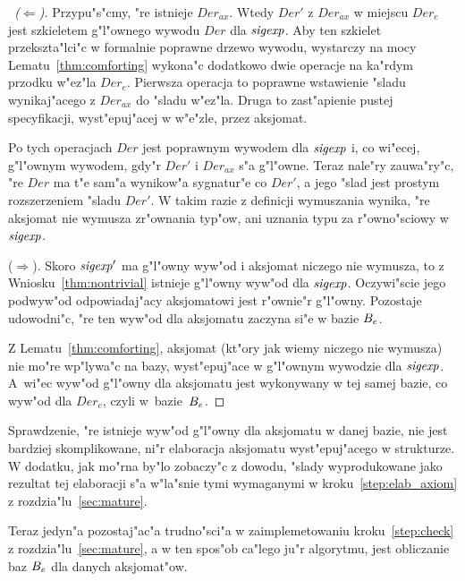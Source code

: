 \begin{proof}[\proofname\ ($\Leftarrow$)]
Przypu"s"cmy, "re istnieje $Der_{ax}$. Wtedy $Der'$ z $Der_{ax}$ w miejscu $Der_e$
jest szkieletem g"l"ownego wywodu $Der$ dla ${\it sigexp}$.
Aby ten szkielet przekszta"lci"c w formalnie poprawne drzewo wywodu, 
wystarczy na mocy Lematu~\ref{thm:comforting}
wykona"c dodatkowo dwie operacje na ka"rdym przodku w"ez"la $Der_e$.
Pierwsza operacja to poprawne wstawienie "sladu wynikaj"acego z $Der_{ax}$ 
do "sladu w"ez"la. Druga to zast"apienie pustej specyfikacji, wyst"epuj"acej
w w"e"zle, przez aksjomat.

Po tych operacjach $Der$ jest poprawnym wywodem dla ${\it sigexp}$ i, co wi"ecej, 
g"l"ownym wywodem, gdy"r $Der'$ i $Der_{ax}$ s"a g"l"owne. Teraz nale"ry zauwa"ry"c, 
"re $Der$ ma t"e sam"a wynikow"a sygnatur"e co $Der'$, a jego "slad
jest prostym rozszerzeniem "sladu $Der'$. W takim razie z definicji wymuszania
wynika, "re aksjomat nie wymusza zr"ownania typ"ow, 
ani uznania typu za r"owno"sciowy w ${\it sigexp}$.

($\Rightarrow$).
Skoro ${\it sigexp}'$ ma g"l"owny wyw"od i aksjomat niczego nie wymusza,
to z Wniosku~\ref{thm:nontrivial} istnieje g"l"owny wyw"od dla ${\it sigexp}$. Oczywi"scie jego
podwyw"od odpowiadaj"acy aksjomatowi jest r"ownie"r g"l"owny.
Pozostaje udowodni"c, "re ten wyw"od dla aksjomatu zaczyna si"e w bazie $B_e$.

Z Lematu~\ref{thm:comforting}, aksjomat (kt"ory jak wiemy niczego nie wymusza)
nie mo"re wp"lywa"c na bazy, wyst"epuj"ace w g"l"ownym wywodzie dla ${\it sigexp}$.
A~wi"ec wyw"od g"l"owny dla aksjomatu jest wykonywany w tej samej bazie, 
co wyw"od dla $Der_e$, czyli w~bazie~$B_e$.
\end{proof}

Sprawdzenie, "re istnieje wyw"od g"l"owny dla aksjomatu w danej bazie,
nie jest bardziej skomplikowane, ni"r elaboracja aksjomatu wyst"epuj"acego w strukturze.
W dodatku, jak mo"rna by"lo zobaczy"c z dowodu, "slady wyprodukowane jako rezultat
tej elaboracji s"a w"la"snie tymi 
wymaganymi w kroku~\ref{step:elab_axiom} z rozdzia"lu~\ref{sec:mature}.

Teraz jedyn"a pozostaj"ac"a trudno"sci"a 
w zaimplemetowaniu kroku~\ref{step:check} z rozdzia"lu~\ref{sec:mature},
a w ten spos"ob ca"lego ju"r algorytmu, jest obliczanie baz $B_e$ dla danych aksjomat"ow.

\subsection{\secinter}
\label{sec:inter}


